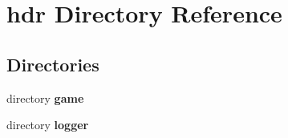 \section{hdr Directory Reference}
\label{dir_0045f852bf8045b6d5abd9c9eb54a446}
\subsection*{Directories}
\begin{DoxyCompactItemize}
\item 
directory {\bf game}
\item 
directory {\bf logger}
\end{DoxyCompactItemize}
